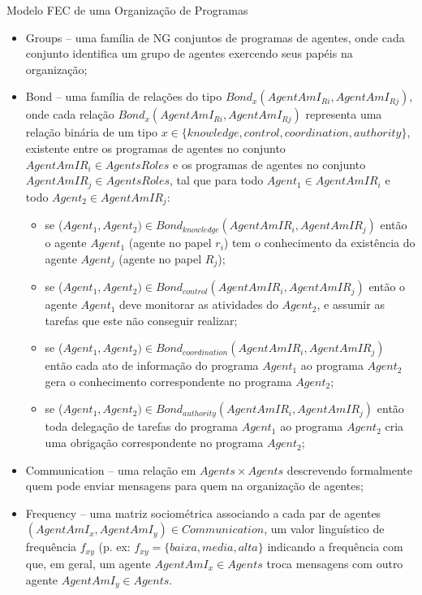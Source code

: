 \begin{section}{Modelo FEC de uma Organização de Programas}
\begin{itemize}
        \item Groups -- uma família de NG conjuntos de programas de agentes, onde cada conjunto identifica um grupo de agentes exercendo seus papéis na organização;
        
        \item Bond -- uma família de relações do tipo $Bond_x(AgentAmI_{Ri}, AgentAmI_{Rj})$, onde cada relação $Bond_x(AgentAmI_{Ri}, AgentAmI_{Rj})$ representa uma relação binária de um tipo $x \in \{knowledge, control, coordination, authority\}$, existente entre os programas de agentes no conjunto $AgentAmIR_{i} \in AgentsRoles$ e os programas de agentes no conjunto $AgentAmIR_{j} \in AgentsRoles$, tal que para todo $Agent_1 \in AgentAmIR_{i}$ e todo $Agent_2 \in AgentAmIR_{j}$:
          
            \begin{itemize}
                \item se ($Agent_1, Agent_2) \in Bond_{knowledge}(AgentAmIR_{i}, AgentAmIR_{j})$ então o agente $Agent_1$ (agente no papel $r_i$) tem o conhecimento da existência do agente $Agent_j$ (agente no papel $R_j$);
                
                \item se ($Agent_1, Agent_2) \in Bond_{control}(AgentAmIR_{i}, AgentAmIR_{j})$ então o agente $Agent_1$ deve monitorar as atividades do $Agent_2$, e assumir as tarefas que este não conseguir realizar;
                
                \item se ($Agent_1, Agent_2) \in Bond_{coordination}(AgentAmIR_{i}, AgentAmIR_{j})$ então cada ato de informação do programa $Agent_1$ ao programa $Agent_2$ gera o conhecimento correspondente no programa $Agent_2$;
                
                \item se ($Agent_1, Agent_2) \in Bond_{authority}(AgentAmIR_{i}, AgentAmIR_{j})$ então toda delegação de tarefas do programa $Agent_1$ ao programa $Agent_2$ cria uma obrigação correspondente no programa $Agent_2$;
                
            \end{itemize}
        
        
        \item Communication -- uma relação em $Agents \times Agents$ descrevendo formalmente quem pode enviar mensagens para quem na organização de agentes;
        
        \item Frequency -- uma matriz sociométrica associando a cada par de agentes $(AgentAmI_x, AgentAmI_y) \in  Communication$, um valor linguístico de frequência $f_{xy}$ (p. ex: $f_{xy} = \{baixa, media, alta\}$ indicando a frequência com que, em geral, um agente $AgentAmI_x \in Agents$ troca mensagens com outro agente $AgentAmI_y \in Agents$.


\end{itemize}
\end{section}
